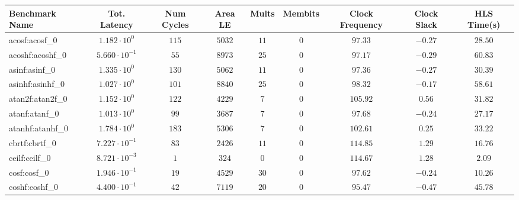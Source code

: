 \begin{tabular}{|l|c|c|c|c|c|c|c|c|}
\hline
Benchmark Name               & Tot. Latency            & Num Cycles & Area LE    & Mults   & Membits  & Clock Frequency & Clock Slack & HLS Time(s) \\
\hline
acosf:acosf\_0               & $ 1.182 \cdot 10^{0}  $ & $ 115    $ & $ 5032   $ & $ 11  $ & $ 0    $ & $ 97.33       $ & $ -0.27   $ & $ 28.50   $ \\
acoshf:acoshf\_0             & $ 5.660 \cdot 10^{-1} $ & $ 55     $ & $ 8973   $ & $ 25  $ & $ 0    $ & $ 97.17       $ & $ -0.29   $ & $ 60.83   $ \\
asinf:asinf\_0               & $ 1.335 \cdot 10^{0}  $ & $ 130    $ & $ 5062   $ & $ 11  $ & $ 0    $ & $ 97.36       $ & $ -0.27   $ & $ 30.39   $ \\
asinhf:asinhf\_0             & $ 1.027 \cdot 10^{0}  $ & $ 101    $ & $ 8840   $ & $ 25  $ & $ 0    $ & $ 98.32       $ & $ -0.17   $ & $ 58.61   $ \\
atan2f:atan2f\_0             & $ 1.152 \cdot 10^{0}  $ & $ 122    $ & $ 4229   $ & $ 7   $ & $ 0    $ & $ 105.92      $ & $ 0.56    $ & $ 31.82   $ \\
atanf:atanf\_0               & $ 1.013 \cdot 10^{0}  $ & $ 99     $ & $ 3687   $ & $ 7   $ & $ 0    $ & $ 97.68       $ & $ -0.24   $ & $ 27.17   $ \\
atanhf:atanhf\_0             & $ 1.784 \cdot 10^{0}  $ & $ 183    $ & $ 5306   $ & $ 7   $ & $ 0    $ & $ 102.61      $ & $ 0.25    $ & $ 33.22   $ \\
cbrtf:cbrtf\_0               & $ 7.227 \cdot 10^{-1} $ & $ 83     $ & $ 2426   $ & $ 11  $ & $ 0    $ & $ 114.85      $ & $ 1.29    $ & $ 16.76   $ \\
ceilf:ceilf\_0               & $ 8.721 \cdot 10^{-3} $ & $ 1      $ & $ 324    $ & $ 0   $ & $ 0    $ & $ 114.67      $ & $ 1.28    $ & $ 2.09    $ \\
cosf:cosf\_0                 & $ 1.946 \cdot 10^{-1} $ & $ 19     $ & $ 4529   $ & $ 30  $ & $ 0    $ & $ 97.62       $ & $ -0.24   $ & $ 10.26   $ \\
coshf:coshf\_0               & $ 4.400 \cdot 10^{-1} $ & $ 42     $ & $ 7119   $ & $ 20  $ & $ 0    $ & $ 95.47       $ & $ -0.47   $ & $ 45.78   $ \\

\end{tabular}

